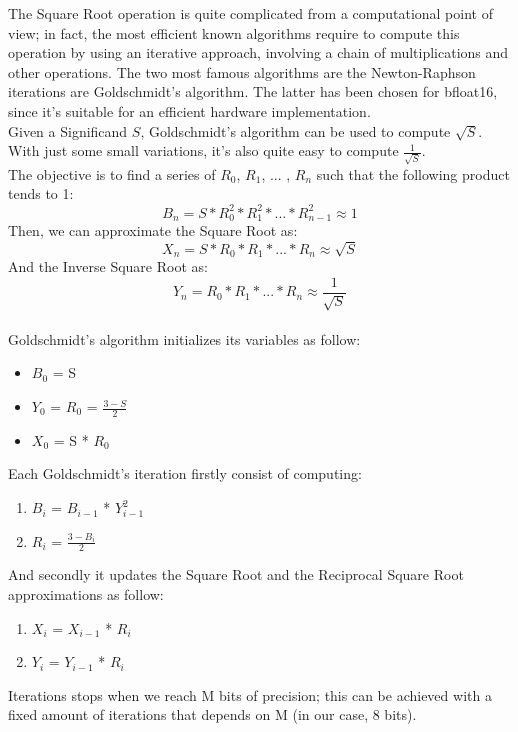 The Square Root operation is quite complicated from a computational point of view; in fact, the most efficient known algorithms require to compute this operation by using an iterative approach, involving a chain of multiplications and other operations. The two most famous algorithms are the Newton-Raphson iterations are Goldschmidt’s algorithm. The latter has been chosen for bfloat16, since it's suitable for an efficient hardware implementation. 
\\
Given a Significand $S$, Goldschmidt's algorithm can be used to compute $\sqrt{S}$. With just some small variations, it's also quite easy to compute $\frac{1}{\sqrt{S}}$.\\
The objective is to find a series of $R_0$, $R_1$, ... , $R_n$ such that the following product tends to 1:
$$B_n = S*R_0^{2}*R_1^{2}* ... * R_{n-1}^{2} \approx 1 $$
Then, we can approximate the Square Root as:
$$ X_{n} = S * R_0*R_1* ... * R_n \approx \sqrt{S} $$
And the Inverse Square Root as:
$$ Y_n =   R_0*R_1* ... * R_n \approx  \frac{1}{\sqrt{S}}$$
\\
Goldschmidt's algorithm initializes its variables as follow:

\begin{itemize}
\item $B_0$ = S
\item $Y_0$ = $R_0$ = $\frac{3-S}{2}$
\item $X_0$ = S * $R_0$
\end{itemize}

Each Goldschmidt's iteration firstly consist of computing:

\begin{enumerate}
\item $B_i$ = $B_{i-1}$ * $Y_{i-1}^{2}$
\item $R_i$ = $\frac{3-B_i}{2}$
\end{enumerate}

And secondly it updates the Square Root and the Reciprocal Square Root approximations as follow:
\begin{enumerate}
\item $X_i$ = $X_{i-1}$ * $R_i$
\item $Y_i$ = $Y_{i-1}$ * $R_i$
\end{enumerate}

Iterations stops when we reach M bits of precision; this can be achieved with a fixed amount of iterations that depends on M (in our case, 8 bits).

\clearpage